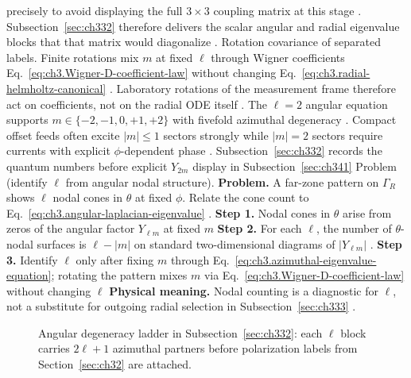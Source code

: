 precisely to avoid displaying the full \(3\times3\) coupling matrix at this stage .
Subsection~\ref{sec:ch332} therefore delivers the scalar angular and radial eigenvalue blocks that that matrix
would diagonalize .
Rotation covariance of separated labels. Finite rotations mix \(m\) at fixed \(\ell\) through Wigner coefficients Eq.~\eqref{eq:ch3.Wigner-D-coefficient-law}
without changing Eq.~\eqref{eq:ch3.radial-helmholtz-canonical} . Laboratory rotations
of the measurement frame therefore act on coefficients, not on the radial ODE itself .
The \(\ell=2\) angular equation supports \(m\in\{-2,-1,0,+1,+2\}\) with fivefold azimuthal degeneracy
. Compact offset feeds often excite \(|m|\le1\) sectors strongly while
\(|m|=2\) sectors require currents with explicit \(\phi\)-dependent phase .
Subsection~\ref{sec:ch332} records the quantum numbers before explicit \(Y_{2m}\) display in Subsection~\ref{sec:ch341}
Problem (identify \(\ell\) from angular nodal structure). \textbf{Problem.} A far-zone pattern on \(\Gamma_R\) shows \(\ell\) nodal cones in \(\theta\) at fixed \(\phi\).
Relate the cone count to Eq.~\eqref{eq:ch3.angular-laplacian-eigenvalue} .
\textbf{Step 1.} Nodal cones in \(\theta\) arise from zeros of the angular factor \(Y_{\ell m}\) at fixed \(m\)
\textbf{Step 2.} For each \(\ell\), the number of \(\theta\)-nodal surfaces is \(\ell-|m|\) on standard
two-dimensional diagrams of \(|Y_{\ell m}|\) .
\textbf{Step 3.} Identify \(\ell\) only after fixing \(m\) through Eq.~\eqref{eq:ch3.azimuthal-eigenvalue-equation};
rotating the pattern mixes \(m\) via Eq.~\eqref{eq:ch3.Wigner-D-coefficient-law} without changing \(\ell\)
\textbf{Physical meaning.} Nodal counting is a diagnostic for \(\ell\), not a substitute for outgoing radial
selection in Subsection~\ref{sec:ch333} .
\begin{figure}[t]
\centering
{}
\caption{Angular degeneracy ladder in Subsection~\ref{sec:ch332}: each \(\ell\) block carries \(2\ell+1\) azimuthal
partners before polarization labels from Section~\ref{sec:ch32} are attached.}
\label{fig:ch3.angular-degeneracy-ladder}
\end{figure}
